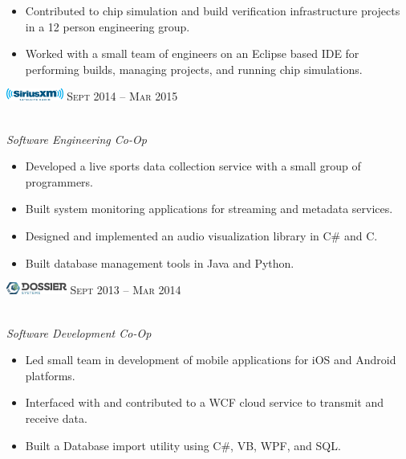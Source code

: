 \documentclass[10pt]{article}
\begin{document}
{\begin{minipage}[t]{0.5\textwidth}
\vspace{-0.2 cm}
\begin{itemize}
  \setlength\itemsep{0.2mm}
    \item[\ding{226}] Contributed to chip simulation and build verification infrastructure projects in a 12 person engineering group.
   \item[\ding{226}] Worked with a small team of engineers on an Eclipse based IDE for performing builds, managing projects, and running chip simulations.
\end{itemize}

\includegraphics[height=0.4cm]{siriusxm} \hfill \textsc{Sept 2014 -- Mar 2015}
{\raggedright\large\\
\textit{Software Engineering Co-Op}\\}

\vspace{-0.2 cm}
\begin{itemize}
  \setlength\itemsep{0.2mm}
  \item[\ding{226}] Developed a live sports data collection service with a small group of programmers.
  \item[\ding{226}] Built system monitoring applications for streaming and metadata services.
  \item[\ding{226}] Designed and implemented an audio visualization library in C\# and C.
  \item[\ding{226}] Built database management tools in Java and Python.
\end{itemize}

\includegraphics[height=0.4cm]{dossier}  \hfill \textsc{Sept 2013 -- Mar 2014}
{\raggedright\large\\
\textit{Software Development Co-Op}\\[5pt]}

\vspace{-0.2 cm}
\begin{itemize}
  \setlength\itemsep{0.2mm}
  \item[\ding{226}] Led small team in development of mobile applications for iOS and Android platforms.
  \item[\ding{226}] Interfaced with and contributed to a WCF cloud service to transmit and receive data.
  \item[\ding{226}] Built a Database import utility using C\#, VB, WPF, and SQL.
\end{itemize}



\end{minipage}}
\end{document}
